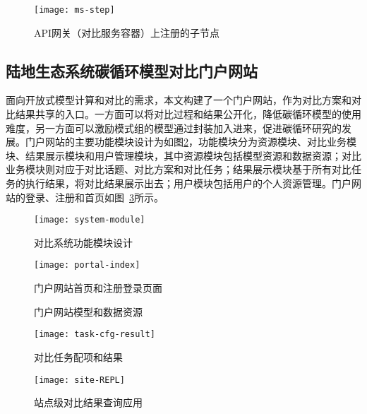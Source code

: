 \begin{figure}[!htbp]
    \centering
    \texttt{[image: ms-step]}
    \caption{API网关（对比服务容器）上注册的子节点}
    \label{fig:api-gateway-children}
\end{figure}

\subsection{陆地生态系统碳循环模型对比门户网站}
面向开放式模型计算和对比的需求，本文构建了一个门户网站，作为对比方案和对比结果共享的入口。一方面可以将对比过程和结果公开化，降低碳循环模型的使用难度，另一方面可以激励模式组的模型通过封装加入进来，促进碳循环研究的发展。门户网站的主要功能模块设计为如图\ref{fig:system-module}，功能模块分为资源模块、对比业务模块、结果展示模块和用户管理模块，其中资源模块包括模型资源和数据资源；对比业务模块则对应于对比话题、对比方案和对比任务；结果展示模块基于所有对比任务的执行结果，将对比结果展示出去；用户模块包括用户的个人资源管理。门户网站的登录、注册和首页如图~\ref{fig:portal-index}所示。

\begin{figure}[!htbp]
    \centering
    \texttt{[image: system-module]}
    \caption{对比系统功能模块设计}
    \label{fig:system-module}
\end{figure}

\begin{figure}[!htbp]
    \centering
    \texttt{[image: portal-index]}
    \caption{门户网站首页和注册登录页面}
    \label{fig:portal-index}
\end{figure}

\begin{figure}[!htbp]
    \centering
    \hfill
    \caption{门户网站模型和数据资源}
    \label{fig:portal-resource}
\end{figure}

\begin{figure}[!htbp]
    \centering
    \texttt{[image: task-cfg-result]}
    \caption{对比任务配项和结果}
    \label{fig:task-cfg-result}
\end{figure}

\begin{figure}[!htbp]
    \centering
    \texttt{[image: site-REPL]}
    \caption{站点级对比结果查询应用}
    \label{fig:site-REPL}
\end{figure}

